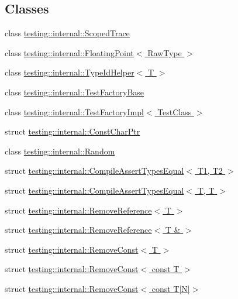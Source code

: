 \subsection*{Classes}
\begin{DoxyCompactItemize}
\item 
class \hyperlink{classtesting_1_1internal_1_1_scoped_trace}{testing\-::internal\-::\-Scoped\-Trace}
\item 
class \hyperlink{classtesting_1_1internal_1_1_floating_point}{testing\-::internal\-::\-Floating\-Point$<$ Raw\-Type $>$}
\item 
class \hyperlink{classtesting_1_1internal_1_1_type_id_helper}{testing\-::internal\-::\-Type\-Id\-Helper$<$ T $>$}
\item 
class \hyperlink{classtesting_1_1internal_1_1_test_factory_base}{testing\-::internal\-::\-Test\-Factory\-Base}
\item 
class \hyperlink{classtesting_1_1internal_1_1_test_factory_impl}{testing\-::internal\-::\-Test\-Factory\-Impl$<$ Test\-Class $>$}
\item 
struct \hyperlink{structtesting_1_1internal_1_1_const_char_ptr}{testing\-::internal\-::\-Const\-Char\-Ptr}
\item 
class \hyperlink{classtesting_1_1internal_1_1_random}{testing\-::internal\-::\-Random}
\item 
struct \hyperlink{structtesting_1_1internal_1_1_compile_assert_types_equal}{testing\-::internal\-::\-Compile\-Assert\-Types\-Equal$<$ T1, T2 $>$}
\item 
struct \hyperlink{structtesting_1_1internal_1_1_compile_assert_types_equal_3_01_t_00_01_t_01_4}{testing\-::internal\-::\-Compile\-Assert\-Types\-Equal$<$ T, T $>$}
\item 
struct \hyperlink{structtesting_1_1internal_1_1_remove_reference}{testing\-::internal\-::\-Remove\-Reference$<$ T $>$}
\item 
struct \hyperlink{structtesting_1_1internal_1_1_remove_reference_3_01_t_01_6_01_4}{testing\-::internal\-::\-Remove\-Reference$<$ T \& $>$}
\item 
struct \hyperlink{structtesting_1_1internal_1_1_remove_const}{testing\-::internal\-::\-Remove\-Const$<$ T $>$}
\item 
struct \hyperlink{structtesting_1_1internal_1_1_remove_const_3_01const_01_t_01_4}{testing\-::internal\-::\-Remove\-Const$<$ const T $>$}
\item 
struct \hyperlink{structtesting_1_1internal_1_1_remove_const_3_01const_01_t[_n]_4}{testing\-::internal\-::\-Remove\-Const$<$ const T\mbox{[}\-N\mbox{]}$>$}

\end{DoxyCompactItemize}
